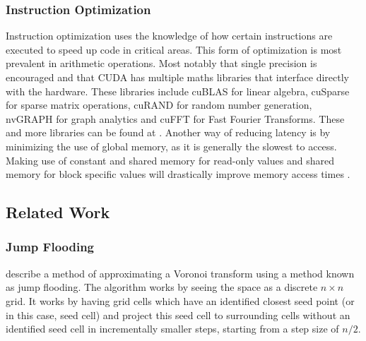 \subsubsection{Instruction Optimization}
Instruction optimization uses the knowledge of how certain instructions are executed to speed up code in critical areas. This form of optimization is most prevalent in arithmetic operations. Most notably that single precision is encouraged and that CUDA has multiple maths libraries that interface directly with the hardware. These libraries include cuBLAS for linear algebra, cuSparse for sparse matrix operations, cuRAND for random number generation, nvGRAPH for graph analytics and cuFFT for Fast Fourier Transforms. These and more libraries can be found at \citet{CUDA_lib}. Another way of reducing latency is by minimizing the use of global memory, as it is generally the slowest to access. Making use of constant and shared memory for read-only values and shared memory for block specific values will drastically improve memory access times \citep{CUDA}.
\subsection{Related Work}\label{gpu:sec:rel}
\subsubsection{Jump Flooding}
\citet{rong2006jump} describe a method of approximating a Voronoi transform using a method known as jump flooding. The algorithm works by seeing the space as a discrete $n \times n$ grid. It works by having grid cells which have an identified closest seed point (or in this case, seed cell) and project this seed cell to surrounding cells without an identified seed cell in incrementally smaller steps, starting from a step size of $n/2$.
